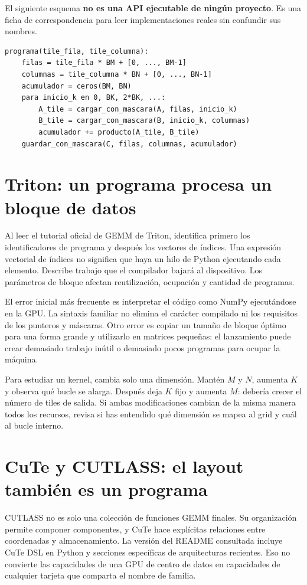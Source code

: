 \documentclass[12pt,a4paper,oneside]{report}
\begin{document}
El siguiente esquema \textbf{no es una API ejecutable de ningún proyecto}. Es una ficha de correspondencia para leer implementaciones reales sin confundir sus nombres.

\begin{lstlisting}
programa(tile_fila, tile_columna):
    filas = tile_fila * BM + [0, ..., BM-1]
    columnas = tile_columna * BN + [0, ..., BN-1]
    acumulador = ceros(BM, BN)
    para inicio_k en 0, BK, 2*BK, ...:
        A_tile = cargar_con_mascara(A, filas, inicio_k)
        B_tile = cargar_con_mascara(B, inicio_k, columnas)
        acumulador += producto(A_tile, B_tile)
    guardar_con_mascara(C, filas, columnas, acumulador)
\end{lstlisting}
\section{Triton: un programa procesa un bloque de datos}
Al leer el tutorial oficial de GEMM de Triton, identifica primero los identificadores de programa y después los vectores de índices. Una expresión vectorial de índices no significa que haya un hilo de Python ejecutando cada elemento. Describe trabajo que el compilador bajará al dispositivo. Los parámetros de bloque afectan reutilización, ocupación y cantidad de programas. \cite{triton-tutorial}

El error inicial más frecuente es interpretar el código como NumPy ejecutándose en la GPU. La sintaxis familiar no elimina el carácter compilado ni los requisitos de los punteros y máscaras. Otro error es copiar un tamaño de bloque óptimo para una forma grande y utilizarlo en matrices pequeñas: el lanzamiento puede crear demasiado trabajo inútil o demasiado pocos programas para ocupar la máquina.

Para estudiar un kernel, cambia solo una dimensión. Mantén $M$ y $N$, aumenta $K$ y observa qué bucle se alarga. Después deja $K$ fijo y aumenta $M$: debería crecer el número de tiles de salida. Si ambas modificaciones cambian de la misma manera todos los recursos, revisa si has entendido qué dimensión se mapea al grid y cuál al bucle interno.

\section{CuTe y CUTLASS: el layout también es un programa}
CUTLASS no es solo una colección de funciones GEMM finales. Su organización permite componer componentes, y CuTe hace explícitas relaciones entre coordenadas y almacenamiento. La versión del README consultada incluye CuTe DSL en Python y secciones específicas de arquitecturas recientes. Eso no convierte las capacidades de una GPU de centro de datos en capacidades de cualquier tarjeta que comparta el nombre de familia. \cite{cutlass}
\end{document}
